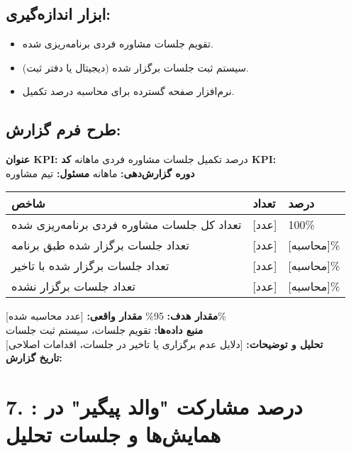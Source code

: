 \documentclass[11pt]{article}
\begin{document}
\subsection*{ابزار اندازه‌گیری:}
\begin{itemize}
    \item تقویم جلسات مشاوره فردی برنامه‌ریزی شده.
    \item سیستم ثبت جلسات برگزار شده (دیجیتال یا دفتر ثبت).
    \item نرم‌افزار صفحه گسترده برای محاسبه درصد تکمیل.
\end{itemize}

\subsection*{طرح فرم گزارش:}
\noindent\textbf{عنوان KPI:} درصد تکمیل جلسات مشاوره فردی ماهانه \hfill \textbf{کد KPI:}  \\
\noindent\textbf{دوره گزارش‌دهی:} ماهانه \hfill \textbf{مسئول:} تیم مشاوره \\

\bigskip
\begin{tabular}{lll}
\textbf{شاخص} & \textbf{تعداد} & \textbf{درصد} \\
\hline
تعداد کل جلسات مشاوره فردی برنامه‌ریزی شده & {[عدد]} & 100\% \\
تعداد جلسات برگزار شده طبق برنامه & {[عدد]} & {[محاسبه]\%} \\
تعداد جلسات برگزار شده با تاخیر & {[عدد]} & {[محاسبه]\%} \\
تعداد جلسات برگزار نشده & {[عدد]} & {[محاسبه]\%} \\
\end{tabular}
\bigskip

\noindent\textbf{مقدار هدف:} 95\% \hfill \textbf{مقدار واقعی:} {[عدد محاسبه شده]\%} \\
\noindent\textbf{منبع داده‌ها:} تقویم جلسات، سیستم ثبت جلسات \\
\noindent\textbf{تحلیل و توضیحات:} {[دلایل عدم برگزاری یا تاخیر در جلسات، اقدامات اصلاحی]} \\
\noindent\textbf{تاریخ گزارش:} \\

\hrulefill
\bigskip

\section*{7. : درصد مشارکت "والد پیگیر" در همایش‌ها و جلسات تحلیل}
\end{document}
